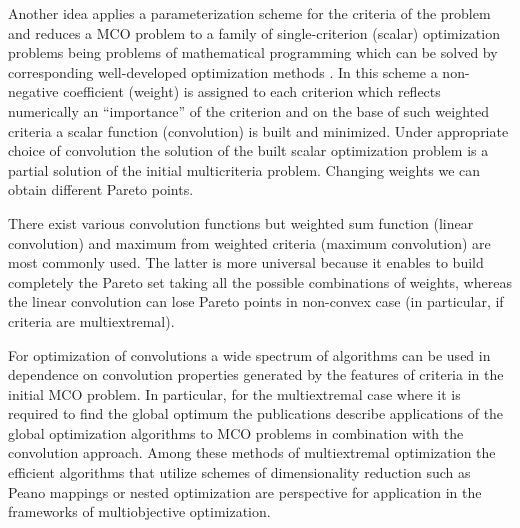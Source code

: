 \documentclass[runningheads]{llncs}
\begin{document}
Another idea applies a parameterization scheme for the criteria of the problem and reduces a MCO problem to a family of single-criterion (scalar) optimization problems being problems of mathematical programming which can be solved by corresponding well-developed optimization methods \cite{Collette2004,Ehrgott2005}. In this scheme a non-negative coefficient (weight) is assigned to each criterion which reflects numerically an ``importance'' of the criterion and on the base of such weighted criteria a scalar function (convolution) is built and minimized. Under appropriate choice of convolution the solution of the built scalar optimization problem is a partial solution of the initial multicriteria problem. Changing weights we can obtain different Pareto points. 

There exist various convolution functions but weighted sum function (linear convolution) and maximum from weighted criteria (maximum convolution) are most commonly used. The latter is more universal because it enables to build completely the Pareto set taking all the possible combinations of weights, whereas the linear convolution can lose Pareto points in non-convex case (in particular, if criteria are multiextremal).

For optimization of convolutions a wide spectrum of algorithms can be used in dependence on convolution properties generated by the features of criteria in the initial MCO problem. In particular, for the multiextremal case where it is required to find the global optimum the publications \cite{Evtushenko2014,Zilinskas2015,GERGEL2017_1,Gergel2019_2,Barkalov2021} describe applications of the global optimization algorithms to MCO problems in combination with the convolution approach. Among these methods of multiextremal optimization the efficient algorithms that utilize  schemes of dimensionality reduction such as Peano mappings \cite{Strongin2000,Sergeyev2013} or nested optimization \cite{Strongin2000,Grishagin2015_2,Grishagin2018} are perspective for application in the  frameworks of multiobjective optimization.

\end{document}
